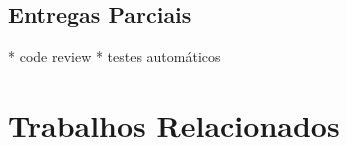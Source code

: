 \subsection{Entregas Parciais}

* code review
* testes automáticos

\section{Trabalhos Relacionados}
